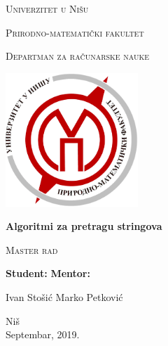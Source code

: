 \begin{titlepage}

\begin{center}
{\large \textsc{Univerzitet u Ni\v su}}
\end{center}
\begin{center}
{\large \textsc{Prirodno-matemati\v cki fakultet}}
\end{center}
\begin{center}
{\large \textsc{Departman za ra\v cunarske nauke}}
\end{center}

\vspace{1.6cm}

\begin{center}
\includegraphics[width=5cm]{img/logo.png}
\end{center}

\vspace{1.6cm}

\begin{center}
{\huge \textbf{Algoritmi za pretragu stringova}}
\end{center}
\begin{center}
{\large \textsc{Master rad}}
\end{center}
\vspace{3cm}

\large

\noindent
\textbf{Student:} \hfill \textbf{Mentor:}

\noindent
Ivan Sto\v si\' c \hfill Marko Petkovi\' c

\vspace{1cm}
\begin{center}{Ni\v s\\
Septembar, 2019.}\end{center}
\end{titlepage}